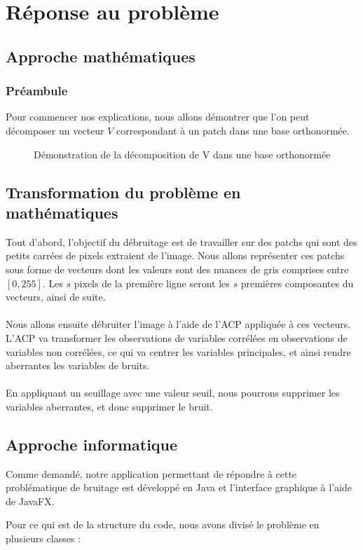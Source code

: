 \section{Réponse au problème}

\subsection{Approche mathématiques}
\subsubsection{Préambule}
Pour commencer nos explications, nous allons démontrer que l'on peut décomposer un vecteur \(V\) correspondant à un patch dans une base orthonormée.\newline
\begin{figure}[hbt!]
    
    \caption{Démonstration de la décomposition de V dans une base orthonormée}
\end{figure}

\subsection{Transformation du problème en mathématiques}
Tout d'abord, l’objectif du débruitage est de travailler sur des patchs qui sont des petits carrées de pixels extraient de l'image. Nous allons représenter ces patchs sous forme de vecteurs dont les valeurs sont des nuances de gris comprises entre \([0,255]\). Les \(s\) pixels de la première ligne seront les \(s\) premières composantes du vecteurs, ainsi de suite. \paragraph{}
Nous allons ensuite débruiter l'image à l'aide de l'ACP appliquée à ces vecteurs. L'ACP va transformer les observations de variables corrélées en observations de variables non corrélées, ce qui va centrer les variables principales, et ainsi rendre aberrantes les variables de bruits. \paragraph{}
En appliquant un seuillage avec une valeur seuil, nous pourrons supprimer les variables aberrantes, et donc supprimer le bruit.

\subsection{Approche informatique}
Comme demandé, notre application permettant de répondre à cette problématique de bruitage est développé en Java et l'interface graphique à l'aide de JavaFX. \par
Pour ce qui est de la structure du code, nous avons divisé le problème en plusieurs classes :


